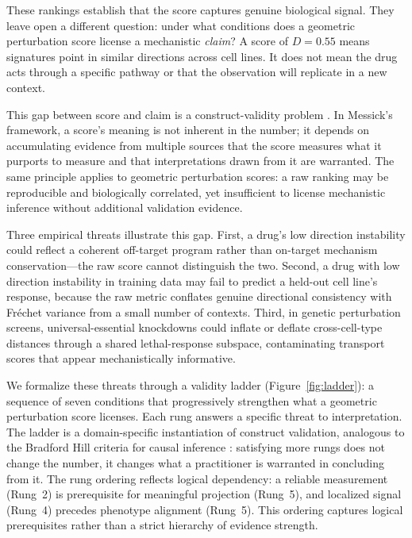 \documentclass[11pt]{article}
\begin{document}
These rankings establish that the score captures genuine biological signal.
They leave open a different question: under what conditions does a
geometric perturbation score license a mechanistic \emph{claim}? A score
of $D = 0.55$ means signatures point in similar directions across cell
lines. It does not mean the drug acts through a specific pathway or that
the observation will replicate in a new context.

This gap between score and claim is a construct-validity problem
\citep{cronbach1955construct,messick1995validity}. In Messick's framework,
a score's meaning is
not inherent in the number; it depends on accumulating evidence from
multiple sources that the score measures what it purports to measure and
that interpretations drawn from it are warranted. The same principle
applies to geometric perturbation scores: a raw ranking may be
reproducible and biologically correlated, yet insufficient to license
mechanistic inference without additional validation evidence.

Three empirical threats illustrate this gap. First, a drug's low direction
instability could reflect a coherent off-target program rather than
on-target mechanism conservation---the raw score cannot distinguish the
two. Second, a drug with low direction instability in training data may
fail to predict a held-out cell line's response, because the raw metric
conflates genuine directional consistency with Fr\'echet variance from a
small number of contexts. Third, in genetic perturbation screens,
universal-essential knockdowns could inflate or deflate cross-cell-type
distances through a shared lethal-response subspace, contaminating
transport scores that appear mechanistically informative.

We formalize these threats through a validity ladder
(Figure~\ref{fig:ladder}): a sequence of seven conditions that
progressively strengthen what a geometric perturbation score licenses.
Each rung answers a specific threat to interpretation. The ladder is a
domain-specific instantiation of construct validation, analogous to the
Bradford Hill criteria for causal inference
\citep{hill1965environment,freiesleben2025benchmarking}: satisfying more
rungs does not change the number, it changes what a practitioner is
warranted in concluding from it. The rung ordering reflects logical
dependency: a reliable measurement (Rung~2) is prerequisite for meaningful
projection (Rung~5), and localized signal (Rung~4) precedes phenotype
alignment (Rung~5). This ordering captures logical prerequisites rather
than a strict hierarchy of evidence strength.
\end{document}
